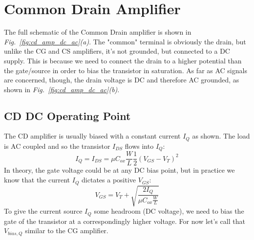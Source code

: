 \section{Common Drain Amplifier}
The full schematic of the Common Drain amplifier is shown in \emph{Fig.~\ref{fig:cd_amp_dc_ac}(a)}.  The "common" terminal is obviously the drain, but unlike the CG and CS amplifiers, it's not grounded, but connected to a DC supply.  This is because we need to connect the drain to a higher potential than the gate/source in order to bias the transistor in saturation.  As far as AC signals are concerned, though, the drain voltage is DC and therefore AC grounded, as shown in \emph{Fig.~\ref{fig:cd_amp_dc_ac}(b)}.
\subsection{CD DC Operating Point}
The CD amplifier is usually biased with a constant current $I_Q$ as shown.  The load is AC coupled and so the transistor $I_{DS}$ flows into $I_Q$:
    \begin{equation}
        I_Q = {I_{DS}} = \mu {C_{ox}}\frac{W}{L}\frac{1}{2}{({V_{GS}} - {V_T})^2}	
    \end{equation}
In theory, the gate voltage could be at any DC bias point, but in practice we know that the current $I_Q$ dictates a positive $V_{GS}$:
    \begin{equation}
        {V_{GS}} = {V_T} + \sqrt {\frac{{2{I_{Q}}}}{{\mu {C_{ox}}\frac{W}{L}}}} 
    \end{equation}
To give the current source $I_Q$ some headroom (DC voltage), we need to bias the gate of the transistor at a correspondingly higher voltage.  For now let's call that $V_{bias,Q}$ similar to the CG amplifier.
